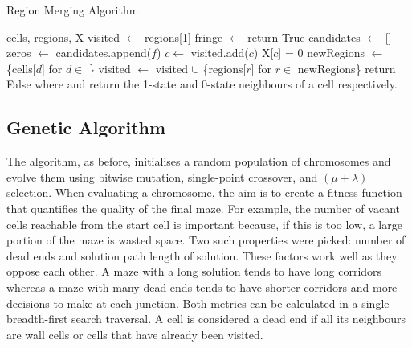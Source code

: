\begin{algorithm}
  \caption{Region Merging Algorithm}\label{alg:region-merge}
  \begin{algorithmic}
  \Require cells, regions, X
  \State visited $\gets$ regions[1]
    \State fringe $\gets$ 
        \State return True 
    \EndIf
    \State candidates $\gets$ []
        \State zeros $\gets$ 
            \State candidates.append($f$)
        \EndIf
    \EndFor
        \State $c \gets$ 
        \State visited.add($c$)
        \State X[$c$] = 0
        \State newRegions $\gets$ \{cells[$d$] for $d \in$ \}
        \State visited $\gets$ visited $\cup$ \{regions[$r$] for $r \in$ newRegions\}
    \Else
        \State return False 
    \EndIf
  \EndWhile
  \State
  \State where  and  return the 1-state and 0-state neighbours of a cell respectively.
  \end{algorithmic}
\end{algorithm}


\subsection{Genetic Algorithm}

The algorithm, as before, initialises a random population of chromosomes and evolve them using bitwise mutation, single-point crossover, and $(\mu + \lambda)$ selection. When evaluating a chromosome, the aim is to create a fitness function that quantifies the quality of the final maze. For example, the number of vacant cells reachable from the start cell is important because, if this is too low, a large portion of the maze is wasted space. Two such properties were picked: number of dead ends and solution path length of solution. These factors work well as they oppose each other. A maze with a long solution tends to have long corridors whereas a maze with many dead ends tends to have shorter corridors and more decisions to make at each junction. Both metrics can be calculated in a single breadth-first search traversal. A cell is considered a dead end if all its neighbours are wall cells or cells that have already been visited.\\

